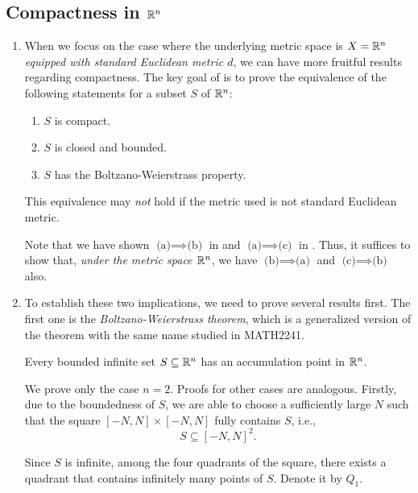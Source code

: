 \subsection{Compactness in \(\mathbb{R}^n\)}
\label{subsect:compactness-rn}
\begin{enumerate}
\item When we focus on the case where the underlying metric space is \(X=\mathbb{R}^n\)
\emph{equipped with standard Euclidean metric \(d\)}, we can have more fruitful
results regarding compactness. The key goal of  is
to prove the equivalence of the following statements for a subset \(S\) of
\(\mathbb{R}^n\):
\begin{enumerate}
\item \(S\) is compact.
\item \(S\) is closed and bounded.
\item \(S\) has the Boltzano-Weierstrass property.
\end{enumerate}
\begin{warning}
This equivalence may \emph{not} hold if the metric used is not standard
Euclidean metric.
\end{warning}

Note that we have shown \(\text{(a)}\implies \text{(b)}\) in
 and \(\text{(a)}\implies \text{(c)}\) in
. Thus, it suffices to show that, \emph{under the metric
space \(\mathbb{R}^n\)}, we have \(\text{(b)}\implies \text{(a)}\) and
\(\text{(c)}\implies \text{(b)}\) also.

\item To establish these two implications, we need to prove several results
first. The first one is the \emph{Boltzano-Weierstrass theorem}, which is a
generalized version of the theorem with the same name studied in MATH2241.

\begin{theorem}
\label{thm:boltzano-weierstrass}
Every bounded infinite set \(S\subseteq \mathbb{R}^n\) has an accumulation point in
\(\mathbb{R}^n\).
\end{theorem}
\begin{pf}
We prove only the case \(n=2\). Proofs for other cases are analogous. Firstly,
due to the boundedness of \(S\), we are able to choose a sufficiently large
\(N\) such that the square \([-N,N]\times [-N,N]\) fully contains \(S\), i.e.,
\[
S\subseteq [-N,N]^{2}.
\]
\begin{center}
\end{center}
Since \(S\) is infinite, among the four quadrants of the square, there exists
a quadrant that contains infinitely many points of \(S\). Denote it by \(Q_1\).


\end{pf}
\end{enumerate}
